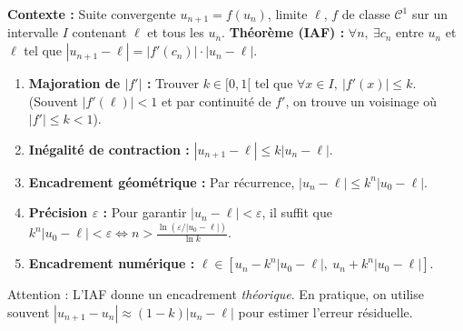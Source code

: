 \documentclass[11pt]{article}
\newcommand{\cle}[1]{{\popxbold\color{popdark}#1}}
\begin{document}
\begin{methode}
\textbf{Contexte :} Suite convergente $u_{n+1}=f(u_n)$, limite $\ell$, $f$ de classe $\mathcal{C}^1$ sur un intervalle $I$ contenant $\ell$ et tous les $u_n$.
\textbf{Théorème (IAF) :} $\forall n,\ \exists c_n$ entre $u_n$ et $\ell$ tel que $|u_{n+1}-\ell| = |f'(c_n)|\cdot|u_n-\ell|$.
\begin{enumerate}
    \item \textbf{Majoration de $|f'|$ :} Trouver $k \in [0, 1[$ tel que $\forall x \in I,\ |f'(x)| \le k$. (Souvent $|f'(\ell)| < 1$ et par continuité de $f'$, on trouve un voisinage où $|f'| \le k < 1$).
    \item \textbf{Inégalité de contraction :} $|u_{n+1}-\ell| \le k |u_n-\ell|$.
    \item \textbf{Encadrement géométrique :} Par récurrence, $|u_n-\ell| \le k^n |u_0-\ell|$.
    \item \textbf{Précision $\varepsilon$ :} Pour garantir $|u_n-\ell| < \varepsilon$, il suffit que $k^n |u_0-\ell| < \varepsilon \iff n > \frac{\ln(\varepsilon/|u_0-\ell|)}{\ln k}$.
    \item \textbf{Encadrement numérique :} $\ell \in [u_n - k^n|u_0-\ell|,\ u_n + k^n|u_0-\ell|]$.
\end{enumerate}
\cle{Attention :} L'IAF donne un encadrement \emph{théorique}. En pratique, on utilise souvent $|u_{n+1}-u_n| \approx (1-k)|u_n-\ell|$ pour estimer l'erreur résiduelle.
\end{methode}
\end{document}
